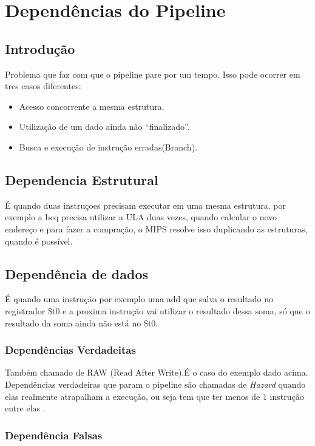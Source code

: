 \documentclass[a4paper]{article}
\begin{document}
\section{Dependências do Pipeline}
\subsection{Introdução}
    Problema que faz com que o pipeline pare por um tempo.
    Isso pode ocorrer em tres casos diferentes:
    \begin{itemize}
        \item Acesso concorrente a mesma estrutura.
        \item Utilização de um dado ainda não ``finalizado''.
        \item Busca e execução de instrução erradas(Branch).
    \end{itemize}

\subsection{Dependencia Estrutural}
    É quando duas instruçoes precisam executar em uma mesma estrutura. por exemplo a beq precisa utilizar a ULA duas
    vezes, quando calcular o novo endereço e para fazer a compração, o MIPS resolve isso duplicando as estruturas,
    quando é possível.

\subsection{Dependência de dados}
    É quando uma instrução por exemplo uma add que salva o resultado no registrador \$t0 e a proxima instrução vai
    utilizar o resultado dessa soma, só que o resultado da soma ainda não está no \$t0.

    \subsubsection{Dependências Verdadeitas}
    Também chamado de RAW (Read After Write),É o caso do exemplo dado acima. Dependências verdadeiras que param o
    pipeline são chamadas de \textit{Hazard} quando elas realmente atrapalham a execução, ou seja tem que ter menos de 1 instrução entre elas .


    \subsubsection{Dependência Falsas}
\end{document}

